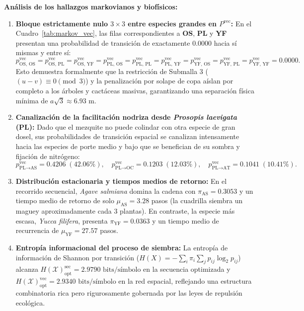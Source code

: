 \documentclass[11pt,a4paper]{article}
\begin{document}
\textbf{Análisis de los hallazgos markovianos y biofísicos:}
\begin{enumerate}[leftmargin=1.5em]
    \item \textbf{Bloque estrictamente nulo $3\times 3$ entre especies grandes en $P^{\text{vec}}$:} En el Cuadro~\ref{tab:markov_vec}, las filas correspondientes a \textbf{OS}, \textbf{PL} y \textbf{YF} presentan una probabilidad de transición de exactamente \textbf{$0.0000$} hacia sí mismas y entre sí:
    \begin{equation}
    p_{\text{OS, OS}}^{\text{vec}} = p_{\text{OS, PL}}^{\text{vec}} = p_{\text{OS, YF}}^{\text{vec}} = p_{\text{PL, OS}}^{\text{vec}} = p_{\text{PL, PL}}^{\text{vec}} = p_{\text{PL, YF}}^{\text{vec}} = p_{\text{YF, OS}}^{\text{vec}} = p_{\text{YF, PL}}^{\text{vec}} = p_{\text{YF, YF}}^{\text{vec}} = \mathbf{0.0000}.
    \end{equation}
    Esto demuestra formalmente que la restricción de Submalla 3 ($(u-v)\equiv 0\pmod 3$) y la penalización por solape de copa aíslan por completo a los árboles y cactáceas masivas, garantizando una separación física mínima de $a\sqrt{3} \approx 6.93\text{ m}$.
    \item \textbf{Canalización de la facilitación nodriza desde \textit{Prosopis laevigata} (\textbf{PL}):} Dado que el mezquite no puede colindar con otra especie de gran dosel, sus probabilidades de transición espacial se canalizan intensamente hacia las especies de porte medio y bajo que se benefician de su sombra y fijación de nitrógeno:
    \begin{equation}
    p_{\text{PL} \to \text{AS}}^{\text{vec}} = \mathbf{0.4206} \; (42.06\%), \quad p_{\text{PL} \to \text{OC}}^{\text{vec}} = \mathbf{0.1203} \; (12.03\%), \quad p_{\text{PL} \to \text{AT}}^{\text{vec}} = \mathbf{0.1041} \; (10.41\%).
    \end{equation}
    \item \textbf{Distribución estacionaria y tiempos medios de retorno:} En el recorrido secuencial, \textit{Agave salmiana} domina la cadena con $\pi_{\text{AS}} = 0.3053$ y un tiempo medio de retorno de solo $\mu_{\text{AS}} = 3.28$ pasos (la cuadrilla siembra un maguey aproximadamente cada 3 plantas). En contraste, la especie más escasa, \textit{Yucca filifera}, presenta $\pi_{\text{YF}} = 0.0363$ y un tiempo medio de recurrencia de $\mu_{\text{YF}} = 27.57$ pasos.
    \item \textbf{Entropía informacional del proceso de siembra:} La entropía de información de Shannon por transición ($H(X) = -\sum_{i} \pi_i \sum_j p_{ij} \log_2 p_{ij}$) alcanza $H(\mathcal{X})_{\text{opt}}^{\text{sec}} = 2.9790\text{ bits/símbolo}$ en la secuencia optimizada y $H(\mathcal{X})_{\text{opt}}^{\text{vec}} = 2.9340\text{ bits/símbolo}$ en la red espacial, reflejando una estructura combinatoria rica pero rigurosamente gobernada por las leyes de repulsión ecológica.
\end{enumerate}
\end{document}
